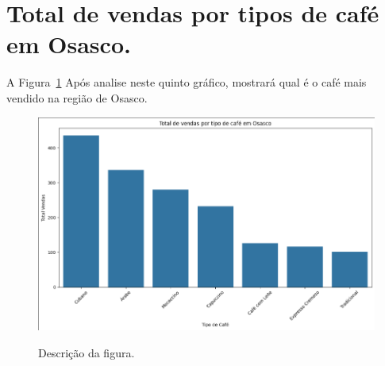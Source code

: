 \section{Total de vendas por tipos de café em Osasco.}
\label{sec:figura}
A Figura~\ref{figuras/Total-vendas-Osasco.png} Após analise neste quinto gráfico, mostrará qual é o café mais vendido na região de Osasco.
\begin{figure}[!ht]
	{\centering
		\caption{Descrição da figura.}
		\includegraphics[width=1.0\textwidth]{figuras/Total-vendas-Osasco.png}
		\label{figuras/Total-vendas-Osasco.png}
	}
\end{figure} \\ \\ \\ \\ \\ \\ \\ \\ \\ \\ 

